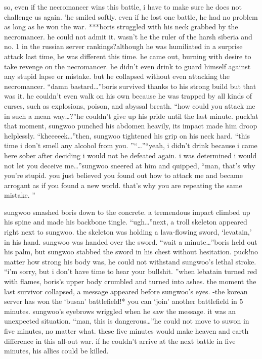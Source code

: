  so, even if the necromancer wins this battle, i have to make sure he does not challenge us again.
’he smiled softly.
 even if he lost one battle, he had no problem as long as he won the war.
***boris struggled with his neck grabbed by the necromancer.
 he could not admit it.
wasn’t he the ruler of the harsh siberia and no.
 1 in the russian server rankings?although he was humiliated in a surprise attack last time, he was different this time.
 he came out, burning with desire to take revenge on the necromancer.
 he didn’t even drink to guard himself against any stupid lapse or mistake.
but he collapsed without even attacking the necromancer.
“damn bastard…”boris survived thanks to his strong build but that was it.
he couldn’t even walk on his own because he was trapped by all kinds of curses, such as explosions, poison, and abyssal breath.
“how could you attack me in such a mean way…?”he couldn’t give up his pride until the last minute.
puck!at that moment, sungwoo punched his abdomen heavily, its impact made him droop helplessly.
“kheeeeek…”then, sungwoo tightened his grip on his neck hard.
“this time i don’t smell any alcohol from you.
”“…”“yeah, i didn’t drink because i came here sober after deciding i would not be defeated again.
 i was determined i would not let you deceive me…”sungwoo sneered at him and quipped, “man, that’s why you’re stupid.
 you just believed you found out how to attack me and became arrogant as if you found a new world.
 that’s why you are repeating the same mistake.
”

sungwoo smashed boris down to the concrete.
 a tremendous impact climbed up his spine and made his backbone tingle.
“ugh…”next, a troll skeleton appeared right next to sungwoo.
 the skeleton was holding a lava-flowing sword, ‘levatain,’ in his hand.
sungwoo was handed over the sword.
“wait a minute…”boris held out his palm, but sungwoo stabbed the sword in his chest without hesitation.
puck!no matter how strong his body was, he could not withstand sungwoo’s lethal stroke.
“i’m sorry, but i don’t have time to hear your bullshit.
”when lebatain turned red with flames, boris’s upper body crumbled and turned into ashes.
the moment the last survivor collapsed, a message appeared before sungwoo’s eyes.
-the korean server has won the ‘busan’ battlefield!* you can ‘join’ another battlefield in 5 minutes.
sungwoo’s eyebrows wriggled when he saw the message.
 it was an unexpected situation.
“man, this is dangerous…”he could not move to suwon in five minutes, no matter what.
 these five minutes would make heaven and earth difference in this all-out war.
 if he couldn’t arrive at the next battle in five minutes, his allies could be killed.


 